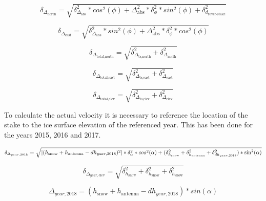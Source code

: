 \begin{equation}
	\delta_{\Delta_{\text{north}}} = \sqrt{\delta_{\Delta_{\text{abs}}}^2 * cos^2(\phi) + \Delta_{\text{abs}}^2 * \delta_{\phi}^2 * sin^2(\phi) + \delta_{d_{\text{rover-stake}}}^2}
\end{equation}

\begin{equation}
	\delta_{\Delta_{\text{east}}} = \sqrt{\delta_{\Delta_{\text{abs}}}^2 * sin^2(\phi) + \Delta_{\text{abs}}^2 * \delta_{\phi}^2 * cos^2(\phi)}
\end{equation}

\begin{equation}
	\delta_{\Delta_{\text{total,north}}} = \sqrt{\delta_{\Delta_{\text{ts,north}}}^2 + \delta_{\Delta_{\text{north}}}^2}
\end{equation}

\begin{equation}
	\delta_{\Delta_{\text{total,east}}} = \sqrt{\delta_{\Delta_{\text{ts,east}}}^2 + \delta_{\Delta_{\text{east}}}^2}
\end{equation}

\begin{equation}
	\delta_{\Delta_{\text{total,elev}}} = \sqrt{\delta_{\Delta_{\text{ts,elev}}}^2 +\delta_{\Delta_{\text{elev}}}^2}
\end{equation}

To calculate the actual velocity it is necessary to reference the location of the stake to the ice surface elevation of the referenced year. 
This has been done for the years 2015, 2016 and 2017.
 
\begin{equation}
\delta_{\Delta_{year,2018}} = \sqrt{\left|(h_{\text{snow}} + h_{\text{antenna}} - dh_{year,2018})^2\right| * \delta_{\alpha}^2 * cos^2(\alpha)\\
+ (\delta_{h_{\text{snow}}}^2 + \delta_{h_{\text{antenna}}}^2 + \delta_{dh_{year,2018}}^2) * \sin^2(\alpha)}
\end{equation}

\begin{equation}
	\delta_{\Delta_{year, \text{elev}}} = \sqrt{\delta_{h_{\text{snow}}}^2 + \delta_{h_{\text{snow}}}^2 + \delta_{h_{\text{snow}}}^2}
\end{equation}

\begin{equation}
	\Delta_{year,2018} = (h_{\text{snow}} + h_{\text{antenna}} - dh_{year,2018}) * sin(\alpha)
\end{equation}

